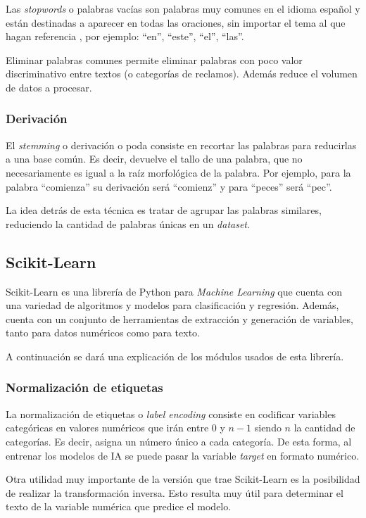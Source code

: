 Las \textit{stopwords} o palabras vacías son palabras muy comunes en el idioma español y están destinadas a aparecer en todas las oraciones, sin importar el tema al que hagan referencia \citep{WEBSITE:16}, por ejemplo: ``en'', ``este'', ``el'', ``las''.

Eliminar palabras comunes permite eliminar palabras con poco valor discriminativo entre textos (o categorías de reclamos). Además reduce el volumen de datos a procesar.

\subsubsection{Derivación}

El \textit{stemming} o derivación o poda consiste en recortar las palabras para reducirlas a una base común. Es decir, devuelve el tallo de una palabra, que no necesariamente es igual a la raíz morfológica de la palabra. Por ejemplo, para la palabra ``comienza'' su derivación será ``comienz'' y para ``peces'' será ``pec''.

La idea detrás de esta técnica es tratar de agrupar las palabras similares, reduciendo la cantidad de palabras únicas en un \textit{dataset}.

\subsection{Scikit-Learn}

Scikit-Learn es una librería de Python para \textit{Machine Learning} que cuenta con una variedad de algoritmos y modelos para clasificación y regresión. Además, cuenta con un conjunto de herramientas de extracción y generación de variables, tanto para datos numéricos como para texto.

A continuación se dará una explicación de los módulos usados de esta librería.

\subsubsection{Normalización de etiquetas}

La normalización de etiquetas o \textit{label encoding} consiste en codificar variables categóricas en valores numéricos que irán entre 0 y $n-1$ siendo $n$ la cantidad de categorías. Es decir, asigna un número único a cada categoría. De esta forma, al entrenar los modelos de IA se puede pasar la variable \textit{target} en formato numérico. 

Otra utilidad muy importante de la versión que trae Scikit-Learn es la posibilidad de realizar la transformación inversa. Esto resulta muy útil para determinar el texto de la variable numérica que predice el modelo.

